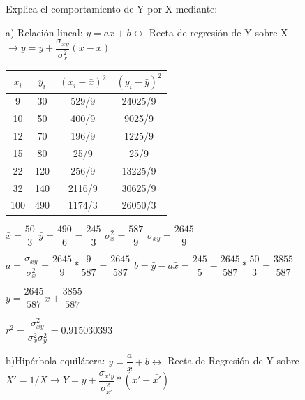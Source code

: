 \documentclass[10pt,a4paper]{article}
\begin{document}
\begin{enumerate}
\vspace{0.25cm}
Explica el comportamiento de Y por X mediante:

\hspace{0.5cm} a) Relación lineal: $y = ax + b \longleftrightarrow $ Recta de regresión de Y sobre X $\rightarrow y = \bar{y} + \dfrac{\sigma_{xy}}{\sigma_{x}^2} (x - \bar{x})$

\vspace{0.25cm}
\begin{center}
\begin{tabular}{|c|c|c|c|}
\hline 
$x_i$ & $y_i$ & $(x_i - \bar{x})^2$ & $(y_i - \bar{y})^2$ \\ 
\hline 
9 & 30 & 529/9 & 24025/9 \\ 
\hline 
10 & 50 & 400/9 & 9025/9 \\ 
\hline 
12 & 70 & 196/9 & 1225/9 \\ 
\hline 
15 & 80 & 25/9 & 25/9 \\ 
\hline 
22 & 120 & 256/9 & 13225/9 \\ 
\hline 
32 & 140 & 2116/9 & 30625/9 \\ 
\hline 
100 & 490 & 1174/3 & 26050/3 \\ 
\hline 
\end{tabular} 
\end{center}

\vspace{0.25cm}
$\bar{x} = \dfrac{50}{3}$	\hspace{2cm} $\bar{y} = \dfrac{490}{6} = \dfrac{245}{3}$ \hspace{2cm} $\sigma_x^2 = \dfrac{587}{9}$ \hspace{2cm}  $\sigma_{xy} = \dfrac{2645}{9}$

\vspace{0.25cm}
$a = \dfrac{\sigma_{xy}}{\sigma_{x}^2} = \dfrac{2645}{9} * \dfrac{9}{587} = \dfrac{2645}{587}$ \hspace{2 cm} $b = \bar{y} - a \bar{x} = \dfrac{245}{5} - \dfrac{2645}{587} * \dfrac{50}{3} = \dfrac{3855}{587}$

\vspace{0.25cm}
\begin{center}
$y = \dfrac{2645}{587} x + \dfrac{3855}{587}$ \\  
\end{center}

\vspace{0.25cm} 
$r^2 = \dfrac{\sigma_{xy}^2}{\sigma_x^2 \sigma_y^2} = 0.915030393 $

\vspace{0.5cm} 
\hspace{0.25cm} b)Hipérbola equilátera: $y = \dfrac{a}{x} +b \longleftrightarrow$ Recta de Regresión de Y sobre $X' = 1/X \rightarrow Y = \bar{y} + \dfrac{\sigma_{x'y}}{\sigma_{x'}^2} * (x' - \bar{x'})$


\end{enumerate}
\end{document}
